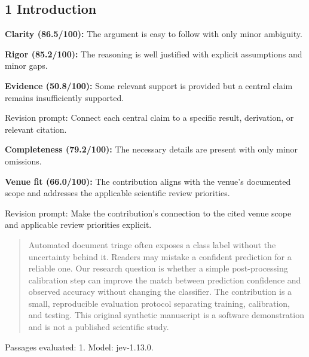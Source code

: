 \documentclass[11pt]{article}
\begin{document}
\subsection{1 Introduction}
\par\textbf{Clarity (86.5/100):} The argument is easy to follow with only minor ambiguity.
\par\textbf{Rigor (85.2/100):} The reasoning is well justified with explicit assumptions and minor gaps.
\par\textbf{Evidence (50.8/100):} Some relevant support is provided but a central claim remains insufficiently supported.
\par Revision prompt: Connect each central claim to a specific result, derivation, or relevant citation.
\par\textbf{Completeness (79.2/100):} The necessary details are present with only minor omissions.
\par\textbf{Venue fit (66.0/100):} The contribution aligns with the venue's documented scope and addresses the applicable scientific review priorities.
\par Revision prompt: Make the contribution's connection to the cited venue scope and applicable review priorities explicit.
\begin{quote}\small Automated document triage often exposes a class label without the uncertainty behind it. Readers may
mistake a confident prediction for a reliable one. Our research question is whether a simple
post-processing calibration step can improve the match between prediction confidence and observed
accuracy without changing the classifier. The contribution is a small, reproducible evaluation protocol
separating training, calibration, and testing. This original synthetic manuscript is a software
demonstration and is not a published scientific study.\end{quote}
Passages evaluated: 1. Model: jev-1.13.0.
\end{document}
